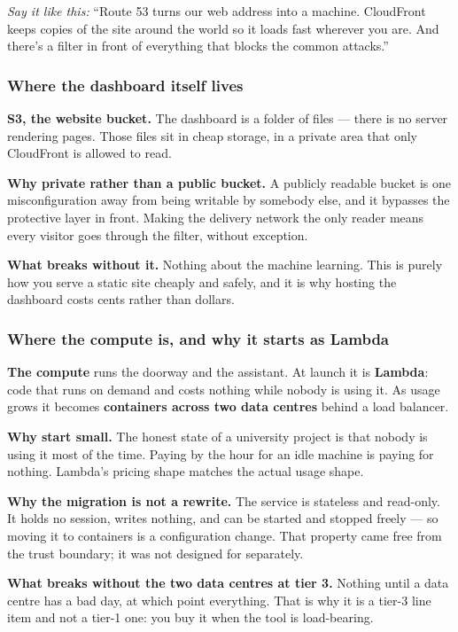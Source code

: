 \documentclass[11pt,a4paper]{article}
\newcommand{\aloud}[1]{\par\smallskip\noindent\textit{\textcolor{accent}{Say
it like this:}} ``#1''\par\smallskip}
\begin{document}
\aloud{Route 53 turns our web address into a machine. CloudFront keeps copies
of the site around the world so it loads fast wherever you are. And there's a
filter in front of everything that blocks the common attacks.}

\subsubsection*{Where the dashboard itself lives}

\textbf{S3, the website bucket.} The dashboard is a folder of files --- there is
no server rendering pages. Those files sit in cheap storage, in a private area
that only CloudFront is allowed to read.

\textbf{Why private rather than a public bucket.} A publicly readable bucket is
one misconfiguration away from being writable by somebody else, and it bypasses
the protective layer in front. Making the delivery network the only reader
means every visitor goes through the filter, without exception.

\textbf{What breaks without it.} Nothing about the machine learning. This is
purely how you serve a static site cheaply and safely, and it is why hosting
the dashboard costs cents rather than dollars.

\subsubsection*{Where the compute is, and why it starts as Lambda}

\textbf{The compute} runs the doorway and the assistant. At launch it is
\textbf{Lambda}: code that runs on demand and costs nothing while nobody is
using it. As usage grows it becomes \textbf{containers across two data
centres} behind a load balancer.

\textbf{Why start small.} The honest state of a university project is that
nobody is using it most of the time. Paying by the hour for an idle machine is
paying for nothing. Lambda's pricing shape matches the actual usage shape.

\textbf{Why the migration is not a rewrite.} The service is stateless and
read-only. It holds no session, writes nothing, and can be started and stopped
freely --- so moving it to containers is a configuration change. That property
came free from the trust boundary; it was not designed for separately.

\textbf{What breaks without the two data centres at tier 3.} Nothing until a
data centre has a bad day, at which point everything. That is why it is a tier-3
line item and not a tier-1 one: you buy it when the tool is load-bearing.
\end{document}
